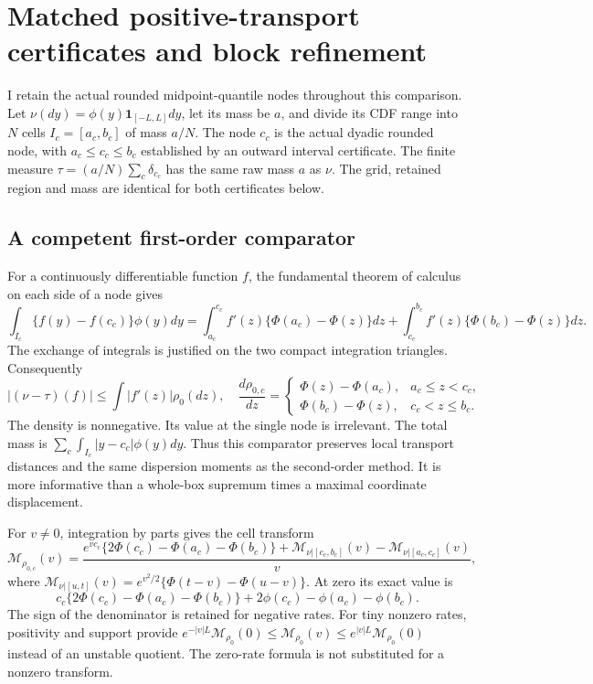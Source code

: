 \section{Matched positive-transport certificates and block refinement}
\label{supp:block-transport-review}

I retain the actual rounded midpoint-quantile nodes throughout this
comparison. Let $\nu(dy)=\phi(y)\mathbf1_{[-L,L]}dy$, let its mass be
$a$, and divide its CDF range into $N$ cells $I_c=[a_c,b_c]$ of mass
$a/N$. The node $c_c$ is the actual dyadic rounded node, with
$a_c\leq c_c\leq b_c$ established by an outward interval certificate.
The finite measure $\tau=(a/N)\sum_c\delta_{c_c}$ has the same raw
mass $a$ as $\nu$. The grid, retained region and mass are identical
for both certificates below.

\subsection{A competent first-order comparator}

For a continuously differentiable function $f$, the fundamental theorem
of calculus on each side of a node gives
\[
 \int_{I_c}\{f(y)-f(c_c)\}\phi(y)dy
 =\int_{a_c}^{c_c} f'(z)\{\Phi(a_c)-\Phi(z)\}dz
  +\int_{c_c}^{b_c} f'(z)\{\Phi(b_c)-\Phi(z)\}dz.
\]
The exchange of integrals is justified on the two compact integration
triangles. Consequently
\[
 |(\nu-\tau)(f)|\leq\int|f'(z)|\rho_0(dz),
\quad
 \frac{d\rho_{0,c}}{dz}=
 \begin{cases}
 \Phi(z)-\Phi(a_c),&a_c\leq z<c_c,\\
 \Phi(b_c)-\Phi(z),&c_c<z\leq b_c.
 \end{cases}
\]
The density is nonnegative. Its value at the single node is irrelevant.
The total mass is $\sum_c\int_{I_c}|y-c_c|\phi(y)dy$. Thus this
comparator preserves local transport distances and the same dispersion
moments as the second-order method. It is more informative than a
whole-box supremum times a maximal coordinate displacement.

For $v\neq0$, integration by parts gives the cell transform
\[
 \mathcal M_{\rho_{0,c}}(v)=\frac{
 e^{vc_c}\{2\Phi(c_c)-\Phi(a_c)-\Phi(b_c)\}
 +\mathcal M_{\nu|[c_c,b_c]}(v)
 -\mathcal M_{\nu|[a_c,c_c]}(v)}{v},
\]
where
$\mathcal M_{\nu|[u,t]}(v)=e^{v^2/2}\{\Phi(t-v)-\Phi(u-v)\}$.
At zero its exact value is
\[
 c_c\{2\Phi(c_c)-\Phi(a_c)-\Phi(b_c)\}
 +2\phi(c_c)-\phi(a_c)-\phi(b_c).
\]
The sign of the denominator is retained for negative rates. For tiny
nonzero rates, positivity and support provide
$e^{-|v|L}\mathcal M_{\rho_0}(0)\leq
 \mathcal M_{\rho_0}(v)\leq
 e^{|v|L}\mathcal M_{\rho_0}(0)$ instead of an unstable quotient.
The zero-rate formula is not substituted for a nonzero transform.

